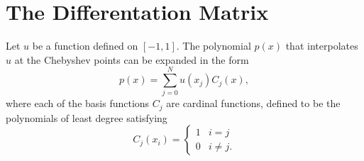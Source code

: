 \section*{The Differentation Matrix}
Let $u$ be a function defined on $[-1,1]$.
The polynomial $p(x)$ that interpolates $u$ at the Chebyshev points can be expanded in the form 
\[p(x) = \sum_{j=0}^N u(x_j)C_j(x),\]
where each of the basis functions $C_j$ are cardinal functions, defined to be the polynomials of least degree satisfying
\begin{equation*}
C_j(x_i) = \begin{cases} 1 & i=j \\ 0 & i \not = j.
   \end{cases}
\end{equation*}

